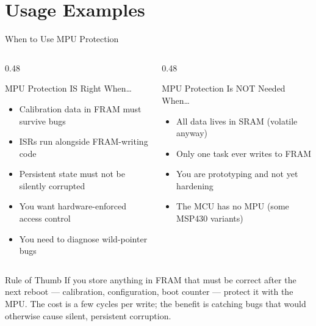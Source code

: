 \documentclass[aspectratio=169, 10pt]{beamer}
\begin{document}
\section{Usage Examples}

\begin{frame}{When to Use MPU Protection}
\begin{columns}[T]
\begin{column}{0.48\textwidth}
\begin{block}{MPU Protection IS Right When\ldots}
\begin{itemize}
  \item Calibration data in FRAM must survive bugs
  \item ISRs run alongside FRAM-writing code
  \item Persistent state must not be silently corrupted
  \item You want hardware-enforced access control
  \item You need to diagnose wild-pointer bugs
\end{itemize}
\end{block}
\end{column}

\begin{column}{0.48\textwidth}
\begin{alertblock}{MPU Protection Is NOT Needed When\ldots}
\begin{itemize}
  \item All data lives in SRAM (volatile anyway)
  \item Only one task ever writes to FRAM
  \item You are prototyping and not yet hardening
  \item The MCU has no MPU (some MSP430 variants)
\end{itemize}
\end{alertblock}
\end{column}
\end{columns}

\vspace{0.5em}
\begin{block}{Rule of Thumb}
If you store anything in FRAM that must be correct after the next reboot ---
calibration, configuration, boot counter --- protect it with the MPU.
The cost is a few cycles per write; the benefit is catching bugs that
would otherwise cause silent, persistent corruption.
\end{block}
\end{frame}
\end{document}
